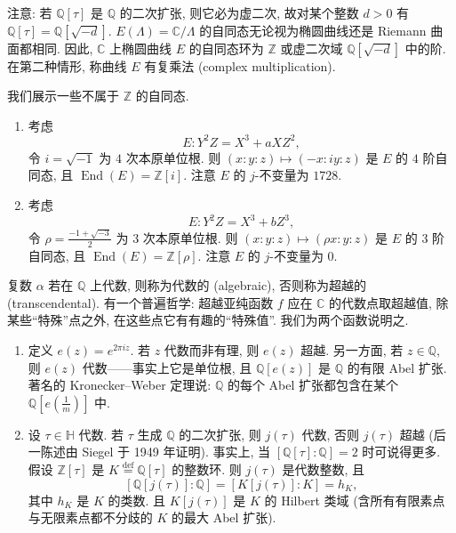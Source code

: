 注意: 若 $\mathbb{Q}[\tau]$ 是 $\mathbb{Q}$ 的二次扩张, 则它必为虚二次, 故对某个整数 $d > 0$ 有 $\mathbb{Q}[\tau] = \mathbb{Q}[\sqrt{-d}]$. $E(\Lambda) = \mathbb{C}/\Lambda$ 的自同态无论视为椭圆曲线还是 Riemann 曲面都相同. 因此, $\mathbb{C}$ 上椭圆曲线 $E$ 的自同态环为 $\mathbb{Z}$ 或虚二次域 $\mathbb{Q}[\sqrt{-d}]$ 中的阶. 在第二种情形, 称曲线 $E$ 有复乘法 (complex multiplication).

\begin{example} \label{thm:3.3.18} 
我们展示一些不属于 $\mathbb{Z}$ 的自同态.
\begin{enumerate}[label=\textup{(\alph*)}]
\item 考虑
\[
E\colon Y^2Z = X^3 + aXZ^2,
\]
令 $i = \sqrt{-1}$ 为 $4$ 次本原单位根. 则 $(x:y:z)\mapsto(-x:iy:z)$ 是 $E$ 的 $4$ 阶自同态, 且 $\operatorname{End}(E) = \mathbb{Z}[i]$. 注意 $E$ 的 $j$-不变量为 $1728$.
\item 考虑
\[
E\colon Y^2Z = X^3 + bZ^3,
\]
令 $\rho = \frac{-1+\sqrt{-3}}{2}$ 为 $3$ 次本原单位根. 则 $(x:y:z)\mapsto(\rho x:y:z)$ 是 $E$ 的 $3$ 阶自同态, 且 $\operatorname{End}(E) = \mathbb{Z}[\rho]$. 注意 $E$ 的 $j$-不变量为 $0$.
\end{enumerate}
\end{example}

\begin{aside} \label{thm:3.3.19} 
复数 $\alpha$ 若在 $\mathbb{Q}$ 上代数, 则称为代数的 (algebraic), 否则称为超越的 (transcendental). 有一个普遍哲学: 超越亚纯函数 $f$ 应在 $\mathbb{C}$ 的代数点取超越值, 除某些``特殊''点之外, 在这些点它有有趣的``特殊值''. 我们为两个函数说明之.
\begin{enumerate}[label=\textup{(\alph*)}]
\item 定义 $e(z) = e^{2\pi iz}$. 若 $z$ 代数而非有理, 则 $e(z)$ 超越. 另一方面, 若 $z\in\mathbb{Q}$, 则 $e(z)$ 代数——事实上它是单位根, 且 $\mathbb{Q}[e(z)]$ 是 $\mathbb{Q}$ 的有限 Abel 扩张. 著名的 Kronecker--Weber 定理说: $\mathbb{Q}$ 的每个 Abel 扩张都包含在某个 $\mathbb{Q}[e(\frac{1}{m})]$ 中.
\item 设 $\tau\in\mathbb{H}$ 代数. 若 $\tau$ 生成 $\mathbb{Q}$ 的二次扩张, 则 $j(\tau)$ 代数, 否则 $j(\tau)$ 超越 (后一陈述由 Siegel 于 1949 年证明). 事实上, 当 $[\mathbb{Q}[\tau]:\mathbb{Q}] = 2$ 时可说得更多. 假设 $\mathbb{Z}[\tau]$ 是 $K \overset{\text{def}}{=} \mathbb{Q}[\tau]$ 的整数环. 则 $j(\tau)$ 是代数整数, 且
\[
[\mathbb{Q}[j(\tau)]:\mathbb{Q}] = [K[j(\tau)]:K] = h_K,
\]
其中 $h_K$ 是 $K$ 的类数. 且 $K[j(\tau)]$ 是 $K$ 的 Hilbert 类域 (含所有有限素点与无限素点都不分歧的 $K$ 的最大 Abel 扩张).
\end{enumerate}
\end{aside}

